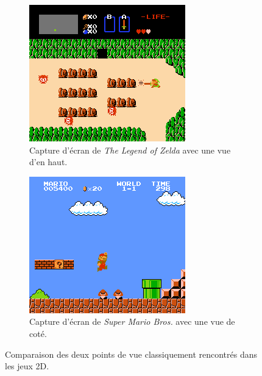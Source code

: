 \begin{figure}[h]
	\null\hfill
	\begin{subfigure}[t]{0.4\textwidth}
		\includegraphics[width=\textwidth]{zelda.png}
		\caption{Capture d'écran de \emph{The Legend of Zelda} avec une vue d'en haut.}
		\label{fig:zelda}
	\end{subfigure}
	\hfill
	\begin{subfigure}[t]{0.4\textwidth}
		\includegraphics[width=\textwidth]{mario.png}
		\caption{Capture d'écran de \emph{Super Mario Bros.} avec une vue de coté.}
		\label{fig:mario}
	\end{subfigure}
	\hfill\null
	\caption{Comparaison des deux points de vue classiquement rencontrés dans les jeux 2D.}
	\label{fig:2dtype}
\end{figure}


